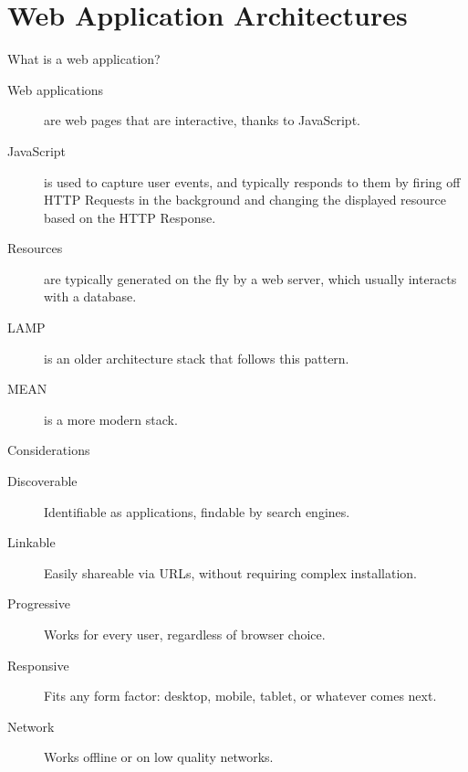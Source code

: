 
\section{Web Application Architectures}

\begin{frame}{What is a web application?}
  \begin{description}
    \item[Web applications] are web pages that are interactive, thanks to JavaScript.
    \item[JavaScript] is used to capture user events, and typically responds to them by firing off HTTP Requests in the background and changing the displayed resource based on the HTTP Response.
    \item[Resources] are typically generated on the fly by a web server, which usually interacts with a database.
    \item[LAMP] is an older architecture stack that follows this pattern.
    \item[MEAN] is a more modern stack.
  \end{description}
\end{frame}

\begin{frame}{Considerations}
  \begin{description}
    \item[Discoverable] Identifiable as applications, findable by search engines.
    \item[Linkable] Easily shareable via URLs, without requiring complex installation.
    \item[Progressive] Works for every user, regardless of browser choice.
    \item[Responsive] Fits any form factor: desktop, mobile, tablet, or whatever comes next.
    \item[Network] Works offline or on low quality networks.
  \end{description}
\end{frame}

